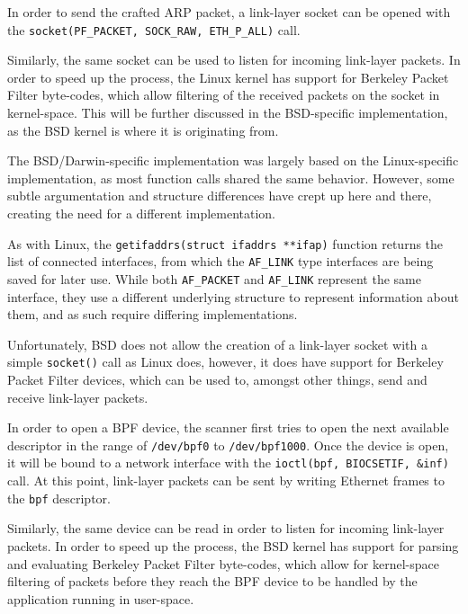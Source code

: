 \documentclass[a4paper,12pt]{article}
\begin{document}
	In order to send the crafted ARP packet, a link-layer socket can be opened with the \texttt{socket(PF_PACKET, SOCK_RAW, ETH_P_ALL)} call.
	
	Similarly, the same socket can be used to listen for incoming link-layer packets. In order to speed up the process, the Linux kernel has support for Berkeley Packet Filter byte-codes, which allow filtering of the received packets on the socket in kernel-space. This will be further discussed in the BSD-specific implementation, as the BSD kernel is where it is originating from.

 

	The BSD/Darwin-specific implementation was largely based on the Linux-specific implementation, as most function calls shared the same behavior. However, some subtle argumentation and structure differences have crept up here and there, creating the need for a different implementation.

	As with Linux, the \texttt{getifaddrs(struct ifaddrs **ifap)} function returns the list of connected interfaces, from which the \texttt{AF_LINK} type interfaces are being saved for later use. While both \texttt{AF_PACKET} and \texttt{AF_LINK} represent the same interface, they use a different underlying structure to represent information about them, and as such require differing implementations.
	
	Unfortunately, BSD does not allow the creation of a link-layer socket with a simple \texttt{socket()} call as Linux does, however, it does have support for Berkeley Packet Filter devices, which can be used to, amongst other things, send and receive link-layer packets.
	
	In order to open a BPF device, the scanner first tries to open the next available descriptor in the range of \texttt{/dev/bpf0} to \texttt{/dev/bpf1000}. Once the device is open, it will be bound to a network interface with the \texttt{ioctl(bpf, BIOCSETIF, &inf)} call. At this point, link-layer packets can be sent by writing Ethernet frames to the \texttt{bpf} descriptor.
	
	Similarly, the same device can be read in order to listen for incoming link-layer packets. In order to speed up the process, the BSD kernel has support for parsing and evaluating Berkeley Packet Filter byte-codes, which allow for kernel-space filtering of packets before they reach the BPF device to be handled by the application running in user-space.
	
\end{document}
